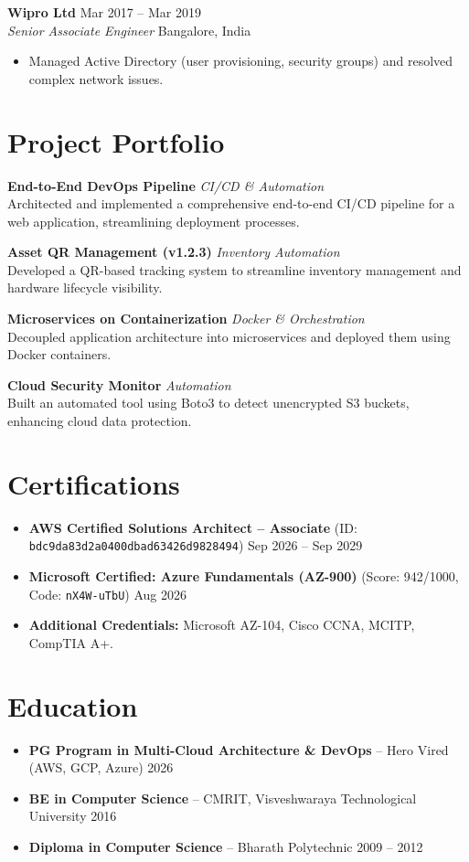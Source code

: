\documentclass[10pt, a4paper]{article}
\begin{document}
\textbf{Wipro Ltd} \hfill Mar 2017 -- Mar 2019 \\
\textit{Senior Associate Engineer} \hfill Bangalore, India
\begin{itemize}
    \item Managed Active Directory (user provisioning, security groups) and resolved complex network issues.
\end{itemize}

\section{Project Portfolio}

\textbf{End-to-End DevOps Pipeline} \textbullet{} \textit{CI/CD \& Automation} \\
Architected and implemented a comprehensive end-to-end CI/CD pipeline for a web application, streamlining deployment processes.

\textbf{Asset QR Management (v1.2.3)} \textbullet{} \textit{Inventory Automation} \\
Developed a QR-based tracking system to streamline inventory management and hardware lifecycle visibility.

\textbf{Microservices on Containerization} \textbullet{} \textit{Docker \& Orchestration} \\
Decoupled application architecture into microservices and deployed them using Docker containers.

\textbf{Cloud Security Monitor} \textbullet{} \textit{Automation} \\
Built an automated tool using Boto3 to detect unencrypted S3 buckets, enhancing cloud data protection.

\section{Certifications}
\begin{itemize}
    \item \textbf{AWS Certified Solutions Architect -- Associate} (ID: \texttt{bdc9da83d2a0400dbad63426d9828494}) \hfill Sep 2026 -- Sep 2029
    \item \textbf{Microsoft Certified: Azure Fundamentals (AZ-900)} (Score: 942/1000, Code: \texttt{nX4W-uTbU}) \hfill Aug 2026
    \item \textbf{Additional Credentials:} Microsoft AZ-104, Cisco CCNA, MCITP, CompTIA A+.
\end{itemize}

\section{Education}
\begin{itemize}
    \item \textbf{PG Program in Multi-Cloud Architecture \& DevOps} -- Hero Vired (AWS, GCP, Azure) \hfill 2026
    \item \textbf{BE in Computer Science} -- CMRIT, Visveshwaraya Technological University \hfill 2016
    \item \textbf{Diploma in Computer Science} -- Bharath Polytechnic \hfill 2009 -- 2012
\end{itemize}
\end{document}
